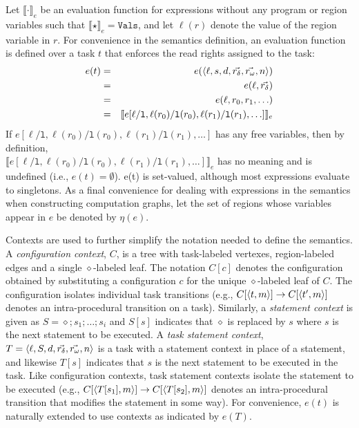 Let $\llbracket \cdot \rrbracket_e$ be an evaluation function for expressions without any program or region variables such that $\llbracket \star \rrbracket_e = \texttt{Vals}$, and let $\ell(r)$ denote the value of the region variable in $r$. For convenience in the semantics definition, an evaluation function is defined over a task $t$ that enforces the read rights assigned to the task:
\begin{eqnarray*}
  e(t) &=& e(\langle \ell, s, d, \vec{r_\delta}, \vec{r_\omega}, n \rangle ) \\
  &=& e(\ell, \vec{r_\delta}) \\
  &=& e(\ell, r_0, r_1, \ldots) \\
  &=& \llbracket e[\ell / \texttt{l},\ell(r_0) / \texttt{l}(r_0), \ell(r_1) / \texttt{l}(r_1), \ldots]  \rrbracket_e
  \end{eqnarray*}
If $e[\ell / \texttt{l},\ell(r_0) / \texttt{l}(r_0), \ell(r_1) / \texttt{l}(r_1), \ldots]$ has any free variables, then by definition, \\
$\llbracket e[\ell / \texttt{l},\ell(r_0) / \texttt{l}(r_0), \ell(r_1) / \texttt{l}(r_1), \ldots]  \rrbracket_e$ has no meaning and is undefined (i.e., $e(t) = \emptyset$). e(t) is set-valued, although most expressions evaluate to singletons. As a final convenience for dealing with expressions in the semantics when constructing computation graphs, let the set of regions whose variables appear in $e$ be denoted by $\eta(e)$. 

Contexts are used to further simplify the notation needed to define the semantics.  A \emph{configuration context}, $C$, is a tree with task-labeled vertexes, region-labeled edges and a single $\diamond$-labeled leaf. The notation $C[c]$ denotes the configuration obtained by substituting a configuration $c$ for the unique $\diamond$-labeled leaf of $C$. The configuration isolates individual task transitions (e.g., $C[\langle t,m \rangle ] \rightarrow C[\langle t^\prime,m \rangle ]$ denotes an intra-procedural transition on a task). Similarly, a \emph{statement context} is given as $S = \diamond ; s_1; \dots ;s_i$ and $S[s]$ indicates that $\diamond$ is replaced by $s$ where $s$ is the next statement to be executed. A \emph{task statement context}, $T = \langle \ell,  S, d, \vec{r_\delta}, \vec{r_\omega}, n \rangle $ is a task with a statement context in place of a statement, and likewise $T[s]$ indicates that $s$ is the next statement to be executed in the task. Like configuration contexts, task statement contexts isolate the statement to be executed (e.g., $C[\langle T[s_1],m \rangle ] \rightarrow C[\langle T[s_2],m \rangle ]$ denotes an intra-procedural transition that modifies the statement in some way). For convenience, $e(t)$ is naturally extended to use contexts as indicated by $e(T)$. 


